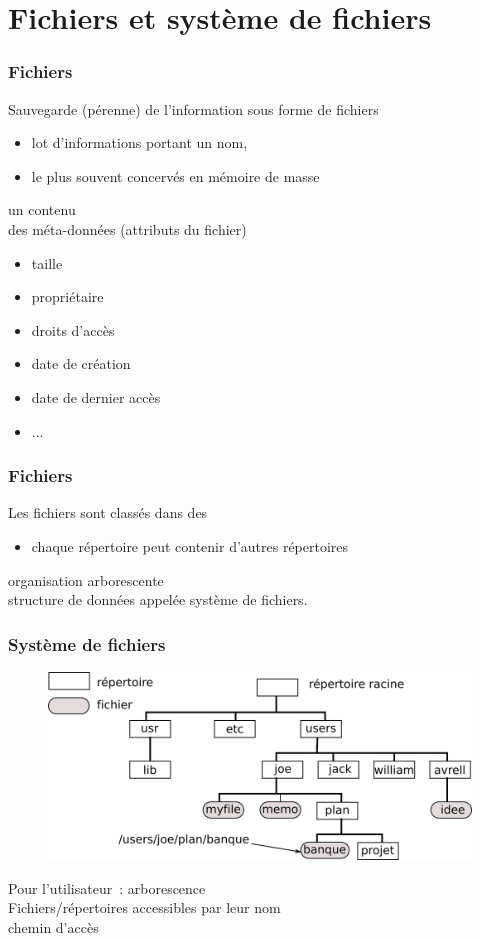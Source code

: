 \section{Fichiers et système de fichiers}
\begin{frame}
  \frametitle{Fichiers}
  Sauvegarde (pérenne) de l'information sous forme de \alert{fichiers}
\begin{itemize}
\item lot d'informations portant un nom, 
\item le plus souvent concervés en mémoire de masse
\end{itemize}

 un \alert{contenu} \\
 des \alert{méta-données} (attributs du fichier) \\
\begin{itemize}
\item taille
\item propriétaire
\item droits d'accès
\item date de création
\item date de dernier accès
\item ...
\end{itemize}
\end{frame}

\begin{frame}
\frametitle{Fichiers}
\vspace{0.5cm}
Les fichiers sont classés dans des 
\begin{itemize}
\item chaque répertoire peut contenir d'autres répertoires
\end{itemize}
\vspace{0.5cm}
 organisation arborescente\\
 \alert{structure de données} appelée \alert{système de fichiers}.
\end{frame}

\begin{frame}
\frametitle{Système de fichiers}
\vspace{-0.4cm}
\begin{figure}
  \includegraphics[width=\linewidth]{fig3/file_sys}
\end{figure}
Pour l'utilisateur~: arborescence\\
Fichiers/répertoires accessibles par leur nom\\ \alert{chemin d'accès}
\end{frame}


